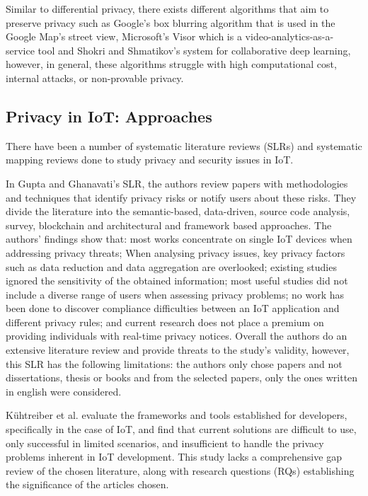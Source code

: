 Similar to differential privacy, there exists different algorithms that aim to
preserve privacy such as Google's box blurring algorithm \cite{FromeLarge}
that is used in the Google Map's street view, Microsoft's Visor \cite{poddar2020visor}
which is a video-analytics-as-a-service tool and Shokri and Shmatikov's
\cite{ShokriPrivacy} system for collaborative deep learning, however, in
general, these algorithms struggle with high computational cost, internal
attacks, or non-provable privacy.

\subsection{Privacy in IoT: Approaches}

There have been a number of systematic literature reviews (SLRs) \cite{Gupta2022Privacy, Kuhtreiber2022survey, sicari2015security, LinSurvey, yang2022overview, zubaydi2023leveraging}
and systematic mapping reviews \cite{porras2018security, ahmed2019aspects}
done to study privacy and security issues in IoT.

In Gupta and Ghanavati's \cite{Gupta2022Privacy} SLR, the authors review
papers with methodologies and techniques that identify privacy risks or
notify users about these risks. They divide the literature into the semantic-based,
data-driven, source code analysis, survey, blockchain and architectural
and framework based approaches. The authors' findings show that: most works concentrate
on single IoT devices when addressing privacy threats; When analysing privacy
issues, key privacy factors such as data reduction and data aggregation
are overlooked; existing studies ignored the sensitivity of the obtained
information; most useful studies did not include a diverse range of users
when assessing privacy problems; no work has been done to discover compliance
difficulties between an IoT application and different privacy rules; and
current research does not place a premium on providing individuals with real-time
privacy notices. Overall the authors do an extensive literature review
and provide threats to the study's validity, however, this SLR has the
following limitations: the authors only chose papers and not dissertations,
thesis or books and from the selected papers, only the ones written in english
were considered.

Kühtreiber et al. \cite{Kuhtreiber2022survey} evaluate the frameworks and
tools established for developers, specifically in the case of IoT, and find
that current solutions are difficult to use, only successful in limited
scenarios, and insufficient to handle the privacy problems inherent in IoT
development. This study lacks a comprehensive gap review of the chosen
literature, along with research questions (RQs) establishing the significance
of the articles chosen.

